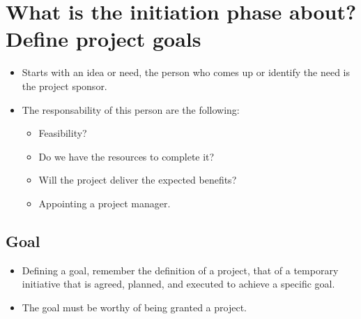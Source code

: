 \section{What is the initiation phase about? Define project goals}
\begin{itemize}
    \item Starts with an idea or need, the person who comes up or identify the need is the project sponsor. 

    \item The responsability of this person are the following:
        \begin{itemize}
            \item Feasibility?
            \item Do we have the resources to complete it?
            \item Will the project deliver the expected benefits?
            \item Appointing a project manager.
        \end{itemize}
\end{itemize}

\subsection{Goal}
\begin{itemize}
    \item Defining a goal, remember the definition of a project, that of a temporary initiative that is agreed, planned, and executed to achieve a specific goal.
    \item  The goal must be worthy of being granted a project.
\end{itemize}

